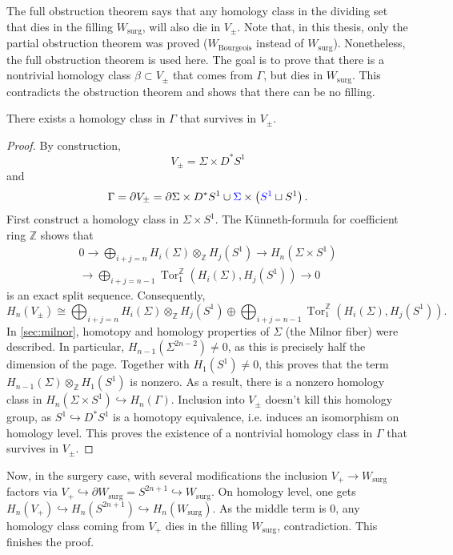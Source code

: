 The full obstruction theorem says that any homology class in the dividing set that dies in the filling $W_\text{surg}$, will also
die in $V_{\pm}$.
Note that, in this thesis, only the partial obstruction theorem was proved ($W_\text{Bourgeois}$ instead of $W_\text{surg}$).
Nonetheless, the full obstruction theorem is used here.
The goal is to prove that there is a nontrivial homology class $\beta \subset V_\pm$ that
comes from $\Gamma$, but dies in $W_\text{surg}$. This contradicts the obstruction theorem and shows that there can be no filling.

\begin{lemma}
    There exists a homology class in $\Gamma$ that survives in $V_\pm$.
\end{lemma}
\begin{proof}
    By construction,
    \[
        V_\pm = \Sigma \times D^*S^1
    \]
    and
    \[
        \Gamma = \partial V_\pm = \partial \Sigma \times D^*S^1 \cup \textcolor{blue}{\Sigma} \times \left(\textcolor{blue}{S^1} \sqcup S^1\right).
    \]
    First construct a homology class in $\Sigma \times S^1$.
    The Künneth-formula for coefficient ring $\mathbb Z$ shows that
    \begin{multline}
        0 \to \bigoplus_{i+j = n} H_i(\Sigma) \otimes_{\mathbb Z} H_j(S^1) \to  H_n(\Sigma \times S^1)\\
        \to \bigoplus_{i+j = n-1} \operatorname{Tor}^\mathbb{Z}_1\left(H_i(\Sigma), H_j(S^1)\right) \to 0
    \end{multline}
    is an exact split sequence.
    Consequently,
    \[
        H_n(V_\pm) \cong \bigoplus_{i+j = n} H_i(\Sigma) \otimes_{\mathbb Z} H_j(S^1) \oplus 
        \bigoplus_{i+j = n-1} \operatorname{Tor}^\mathbb{Z}_1\left(H_i(\Sigma), H_j(S^1)\right).
    \]
    In \cref{sec:milnor}, homotopy and homology properties of $\Sigma$ (the Milnor fiber) were described.
    In particular, $H_{n-1}(\Sigma^{2n-2}) \neq 0$, as this is precisely half the dimension of the page.
    Together with $H_1(S^1) \neq 0$, this proves that the term $H_{n-1}(\Sigma) \otimes_{\mathbb Z} H_1(S^1)$ is nonzero. As a result, 
    there is a nonzero homology class in $H_n(\Sigma \times S^1) \hookrightarrow H_n(\Gamma)$.
    Inclusion into $V_\pm$ doesn't kill this homology group, as $S^1 \hookrightarrow D^*S^1$ is a homotopy equivalence,
    i.e. induces an isomorphism on homology level. 
    This proves the existence of a nontrivial homology class in $\Gamma$ that survives in $V_\pm$.
\end{proof}

Now, in the surgery case, with several modifications the inclusion
$V_+ \to W_\text{surg}$ factors via $V_+ \hookrightarrow \partial W_\text{surg} = S^{2n+1} \hookrightarrow W_\text{surg}$.
On homology level, one gets
$H_n(V_+) \hookrightarrow H_n(S^{2n+1}) \hookrightarrow H_n(W_\text{surg})$.
As the middle term is $0$, any homology class coming from $V_+$ dies in the filling $W_\text{surg}$, contradiction.
This finishes the proof.